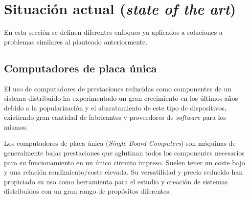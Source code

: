 

\section{Situación actual (\textit{state of the art})}
\label{stateoftheart}
En esta sección se definen diferentes enfoques ya aplicados a soluciones a problemas similares al planteado anteriormente.

\subsection{Computadores de placa única}

El uso de computadores de prestaciones reducidas como componentes de un sistema distribuido ha experimentado un gran crecimiento en los últimos años debido a la popularización y el abaratamiento de este tipo de dispositivos, existiendo gran cantidad de fabricantes y proveedores de \textit{software} para los mismos.

Los computadores de placa única (\textit{Single-Board Computers}) son máquinas de generalmente bajas prestaciones que aglutinan todos los componentes necesarios para su funcionamiento en un único circuito impreso. Suelen tener un coste bajo y una relación rendimiento/coste elevada. Su versatilidad y precio reducido han propiciado su uso como herramienta para el estudio y creación de sistemas distribuidos con un gran rango de propósitos diferentes.

